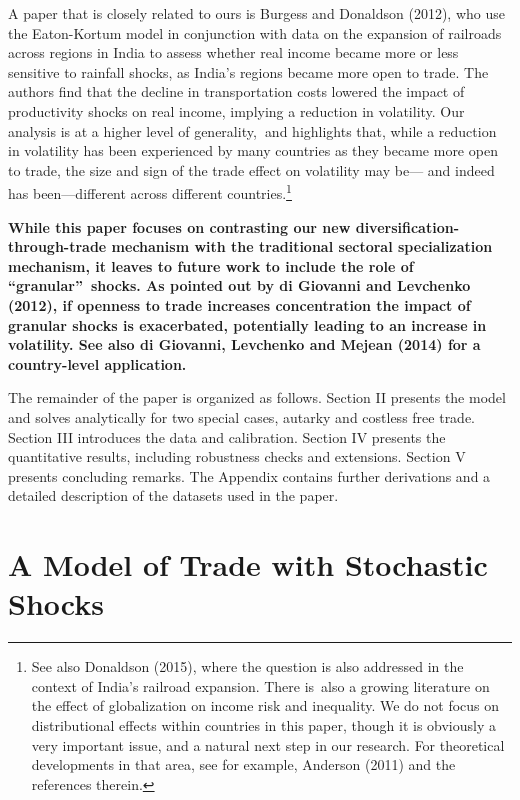 \documentclass[12pt]{article}
\begin{document}
A paper that is closely related to ours is Burgess and Donaldson (2012), who
use the Eaton-Kortum model in conjunction with data on the expansion of
railroads across regions in India to assess whether real income became more
or less sensitive to rainfall shocks, as India's regions became more open to
trade. The authors find that the decline in transportation costs lowered the
impact of productivity shocks on real income, implying a reduction in
volatility. Our analysis is at a higher level of generality,\textbf{\ }and
highlights that, while a reduction in volatility has been experienced by
many countries as they became more open to trade, the size and sign of the
trade effect on volatility may be--- and indeed has been---different across
different countries.\footnote{%
See also Donaldson (2015), where the question is also addressed in the
context of India's railroad expansion. There is\ also a growing literature
on the effect of globalization on income risk and inequality. We do not
focus on distributional effects within countries in this paper, though it is
obviously a very important issue, and a natural next step in our research.
For theoretical developments in that area, see for example, Anderson (2011)
and the references therein.}

\textbf{While this paper focuses on contrasting our new
diversification-through-trade mechanism with the traditional sectoral
specialization mechanism, it leaves to future work to include the role of
\textquotedblleft granular\textquotedblright\ shocks. As pointed out by di
Giovanni and Levchenko (2012), if openness to trade increases concentration
the impact of granular shocks is exacerbated, potentially leading to an
increase in volatility. See also di Giovanni, Levchenko and Mejean (2014)
for a country-level application.}

The remainder of the paper is organized as follows. Section II presents the
model and solves analytically for two special cases, autarky and costless
free trade. Section III introduces the data and calibration. Section IV
presents the quantitative results, including robustness checks and
extensions. Section V presents concluding remarks. The Appendix contains
further derivations and a detailed description of the datasets used in the
paper.

\section{A Model of Trade with Stochastic Shocks}
\end{document}
